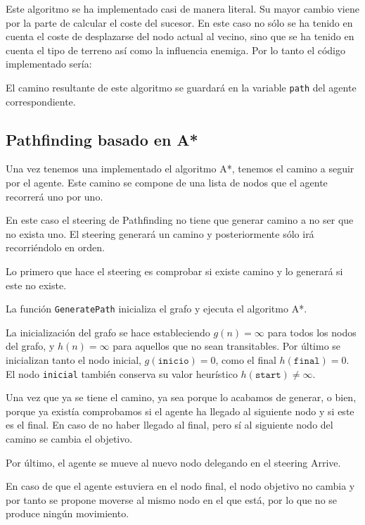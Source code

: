 Este algoritmo se ha implementado casi de manera literal. Su mayor cambio viene por la parte de calcular el coste del sucesor. En este caso no sólo se ha tenido en cuenta el coste de desplazarse del nodo actual al vecino, sino que se ha tenido en cuenta el tipo de terreno así como la influencia enemiga. Por lo tanto el código implementado sería:



El camino resultante de este algoritmo se guardará en la variable \texttt{path} del agente correspondiente. 

\subsection{Pathfinding basado en A*}

Una vez tenemos una implementado el algoritmo A*, tenemos el camino a seguir por el agente. Este camino se compone de una lista de nodos que el agente recorrerá uno por uno.

En este caso el steering de Pathfinding no tiene que generar camino a no ser que no exista uno. El steering generará un camino y posteriormente sólo irá recorriéndolo en orden.

Lo primero que hace el steering es comprobar si existe camino y lo generará si este no existe.



La función \texttt{GeneratePath} inicializa el grafo y ejecuta el algoritmo A*.



La inicialización del grafo se hace estableciendo $g(n) = \infty$ para todos los nodos del grafo, y $h(n) = \infty$ para aquellos que no sean transitables. Por último se inicializan tanto el nodo inicial, $g(\texttt{inicio}) = 0$, como el final $h(\texttt{final}) = 0$. El nodo \texttt{inicial} también conserva su valor heurístico $h(\texttt{start}) \neq \infty$.



Una vez que ya se tiene el camino, ya sea porque lo acabamos de generar, o bien, porque ya existía comprobamos si el agente ha llegado al siguiente nodo y si este es el final. En caso de no haber llegado al final, pero sí al siguiente nodo del camino se cambia el objetivo.



Por último, el agente se mueve al nuevo nodo delegando en el steering Arrive.



En caso de que el agente estuviera en el nodo final, el nodo objetivo no cambia y por tanto se propone moverse al mismo nodo en el que está, por lo que no se produce ningún movimiento.
